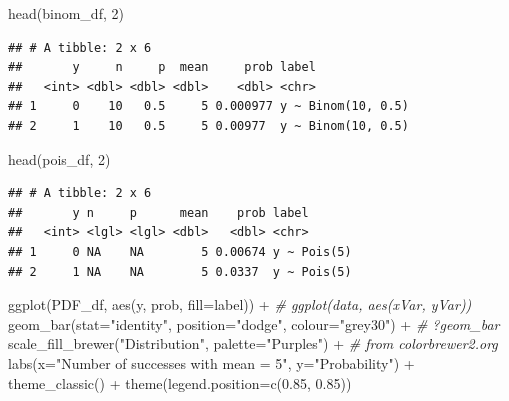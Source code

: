 \documentclass[
  11pt,
  a4paper,
]{book}
\newenvironment{Shaded}{\begin{snugshade}}{\end{snugshade}}
\newcommand{\AttributeTok}[1]{\textcolor[rgb]{0.77,0.63,0.00}{#1}}
\newcommand{\CommentTok}[1]{\textcolor[rgb]{0.56,0.35,0.01}{\textit{#1}}}
\newcommand{\DecValTok}[1]{\textcolor[rgb]{0.00,0.00,0.81}{#1}}
\newcommand{\FloatTok}[1]{\textcolor[rgb]{0.00,0.00,0.81}{#1}}
\newcommand{\FunctionTok}[1]{\textcolor[rgb]{0.00,0.00,0.00}{#1}}
\newcommand{\NormalTok}[1]{#1}
\newcommand{\SpecialCharTok}[1]{\textcolor[rgb]{0.00,0.00,0.00}{#1}}
\newcommand{\StringTok}[1]{\textcolor[rgb]{0.31,0.60,0.02}{#1}}
\begin{document}
\begin{Shaded}
\begin{Highlighting}[]
\FunctionTok{head}\NormalTok{(binom\_df, }\DecValTok{2}\NormalTok{)}
\end{Highlighting}
\end{Shaded}

\begin{verbatim}
## # A tibble: 2 x 6
##       y     n     p  mean     prob label             
##   <int> <dbl> <dbl> <dbl>    <dbl> <chr>             
## 1     0    10   0.5     5 0.000977 y ~ Binom(10, 0.5)
## 2     1    10   0.5     5 0.00977  y ~ Binom(10, 0.5)
\end{verbatim}

\begin{Shaded}
\begin{Highlighting}[]
\FunctionTok{head}\NormalTok{(pois\_df, }\DecValTok{2}\NormalTok{)}
\end{Highlighting}
\end{Shaded}

\begin{verbatim}
## # A tibble: 2 x 6
##       y n     p      mean    prob label      
##   <int> <lgl> <lgl> <dbl>   <dbl> <chr>      
## 1     0 NA    NA        5 0.00674 y ~ Pois(5)
## 2     1 NA    NA        5 0.0337  y ~ Pois(5)
\end{verbatim}

\begin{Shaded}
\begin{Highlighting}[]
\FunctionTok{ggplot}\NormalTok{(PDF\_df, }\FunctionTok{aes}\NormalTok{(y, prob, }\AttributeTok{fill=}\NormalTok{label)) }\SpecialCharTok{+}  \CommentTok{\# ggplot(data, aes(xVar, yVar))}
  \FunctionTok{geom\_bar}\NormalTok{(}\AttributeTok{stat=}\StringTok{"identity"}\NormalTok{, }\AttributeTok{position=}\StringTok{"dodge"}\NormalTok{, }\AttributeTok{colour=}\StringTok{"grey30"}\NormalTok{) }\SpecialCharTok{+}  \CommentTok{\# ?geom\_bar}
  \FunctionTok{scale\_fill\_brewer}\NormalTok{(}\StringTok{"Distribution"}\NormalTok{, }\AttributeTok{palette=}\StringTok{"Purples"}\NormalTok{) }\SpecialCharTok{+} \CommentTok{\# from colorbrewer2.org}
  \FunctionTok{labs}\NormalTok{(}\AttributeTok{x=}\StringTok{"Number of successes with mean = 5"}\NormalTok{, }\AttributeTok{y=}\StringTok{"Probability"}\NormalTok{) }\SpecialCharTok{+}
  \FunctionTok{theme\_classic}\NormalTok{() }\SpecialCharTok{+} \FunctionTok{theme}\NormalTok{(}\AttributeTok{legend.position=}\FunctionTok{c}\NormalTok{(}\FloatTok{0.85}\NormalTok{, }\FloatTok{0.85}\NormalTok{))}
\end{Highlighting}
\end{Shaded}
\end{document}
